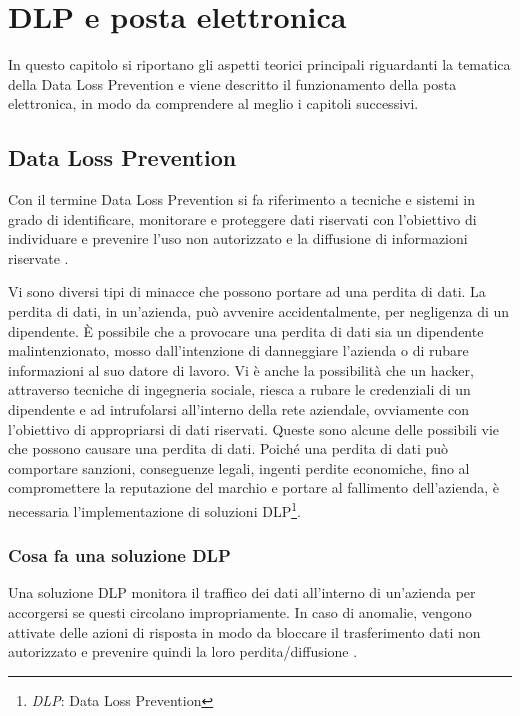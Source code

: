 \chapter{DLP e posta elettronica}

In questo capitolo si riportano gli aspetti teorici principali riguardanti la tematica della Data Loss Prevention
e viene descritto il funzionamento della posta elettronica, in modo da comprendere al meglio i capitoli
successivi.

\section{Data Loss Prevention}
Con il termine Data Loss Prevention si fa riferimento a 
tecniche e sistemi in grado di identificare, monitorare 
e proteggere dati riservati con l’obiettivo di individuare 
e prevenire l’uso non autorizzato e la diffusione di informazioni riservate \cite{DLP1}. 

Vi sono diversi tipi di minacce che possono portare ad una perdita di dati.
La perdita di dati, in un'azienda, può avvenire accidentalmente, per negligenza di un 
dipendente. È possibile che a provocare una perdita di dati sia un dipendente malintenzionato,
mosso dall'intenzione di danneggiare l'azienda o di rubare informazioni al suo datore di lavoro.
Vi è anche la possibilità che un hacker, attraverso tecniche di ingegneria sociale, riesca a rubare
le credenziali di un dipendente e ad intrufolarsi all'interno della rete aziendale, ovviamente con 
l'obiettivo di appropriarsi di dati riservati.
Queste sono alcune delle possibili vie che possono causare una perdita di dati. Poiché una perdita di dati
può comportare sanzioni, conseguenze legali, ingenti perdite economiche, fino al compromettere la reputazione del 
marchio e portare al fallimento dell'azienda, è necessaria l'implementazione di soluzioni
DLP\footnote{\textit{DLP}: Data Loss Prevention}.
 

\subsection{Cosa fa una soluzione DLP}
    Una soluzione DLP monitora il traffico dei dati all'interno di un'azienda per accorgersi se
    questi circolano impropriamente. In caso di anomalie, vengono attivate delle azioni di risposta 
    in modo da bloccare il trasferimento dati non autorizzato e prevenire quindi la loro perdita/diffusione \cite{DLP2}.
    


